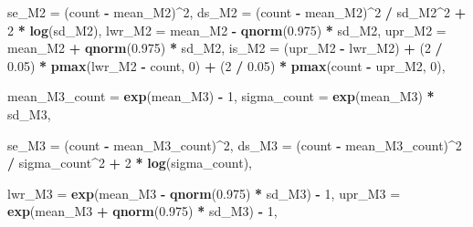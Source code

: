 \documentclass[
]{article}
\newenvironment{Shaded}{\begin{snugshade}}{\end{snugshade}}
\newcommand{\AttributeTok}[1]{\textcolor[rgb]{0.13,0.29,0.53}{#1}}
\newcommand{\DecValTok}[1]{\textcolor[rgb]{0.00,0.00,0.81}{#1}}
\newcommand{\FloatTok}[1]{\textcolor[rgb]{0.00,0.00,0.81}{#1}}
\newcommand{\FunctionTok}[1]{\textcolor[rgb]{0.13,0.29,0.53}{\textbf{#1}}}
\newcommand{\NormalTok}[1]{#1}
\newcommand{\SpecialCharTok}[1]{\textcolor[rgb]{0.81,0.36,0.00}{\textbf{#1}}}
\begin{document}
\begin{Shaded}
\begin{Highlighting}[]
    \AttributeTok{se\_M2 =}\NormalTok{ (count }\SpecialCharTok{{-}}\NormalTok{ mean\_M2)}\SpecialCharTok{\^{}}\DecValTok{2}\NormalTok{,}
    \AttributeTok{ds\_M2 =}\NormalTok{ (count }\SpecialCharTok{{-}}\NormalTok{ mean\_M2)}\SpecialCharTok{\^{}}\DecValTok{2} \SpecialCharTok{/}\NormalTok{ sd\_M2}\SpecialCharTok{\^{}}\DecValTok{2} \SpecialCharTok{+} \DecValTok{2} \SpecialCharTok{*} \FunctionTok{log}\NormalTok{(sd\_M2),}
    \AttributeTok{lwr\_M2 =}\NormalTok{ mean\_M2 }\SpecialCharTok{{-}} \FunctionTok{qnorm}\NormalTok{(}\FloatTok{0.975}\NormalTok{) }\SpecialCharTok{*}\NormalTok{ sd\_M2,}
    \AttributeTok{upr\_M2 =}\NormalTok{ mean\_M2 }\SpecialCharTok{+} \FunctionTok{qnorm}\NormalTok{(}\FloatTok{0.975}\NormalTok{) }\SpecialCharTok{*}\NormalTok{ sd\_M2,}
    \AttributeTok{is\_M2 =}\NormalTok{ (upr\_M2 }\SpecialCharTok{{-}}\NormalTok{ lwr\_M2) }\SpecialCharTok{+}
\NormalTok{      (}\DecValTok{2} \SpecialCharTok{/} \FloatTok{0.05}\NormalTok{) }\SpecialCharTok{*} \FunctionTok{pmax}\NormalTok{(lwr\_M2 }\SpecialCharTok{{-}}\NormalTok{ count, }\DecValTok{0}\NormalTok{) }\SpecialCharTok{+}
\NormalTok{      (}\DecValTok{2} \SpecialCharTok{/} \FloatTok{0.05}\NormalTok{) }\SpecialCharTok{*} \FunctionTok{pmax}\NormalTok{(count }\SpecialCharTok{{-}}\NormalTok{ upr\_M2, }\DecValTok{0}\NormalTok{),}
    
    \AttributeTok{mean\_M3\_count    =} \FunctionTok{exp}\NormalTok{(mean\_M3) }\SpecialCharTok{{-}} \DecValTok{1}\NormalTok{,}
    \AttributeTok{sigma\_count =} \FunctionTok{exp}\NormalTok{(mean\_M3) }\SpecialCharTok{*}\NormalTok{ sd\_M3,}
    
    \AttributeTok{se\_M3  =}\NormalTok{ (count }\SpecialCharTok{{-}}\NormalTok{ mean\_M3\_count)}\SpecialCharTok{\^{}}\DecValTok{2}\NormalTok{,}
    \AttributeTok{ds\_M3  =}\NormalTok{ (count }\SpecialCharTok{{-}}\NormalTok{ mean\_M3\_count)}\SpecialCharTok{\^{}}\DecValTok{2} \SpecialCharTok{/}\NormalTok{ sigma\_count}\SpecialCharTok{\^{}}\DecValTok{2} \SpecialCharTok{+} \DecValTok{2} \SpecialCharTok{*} \FunctionTok{log}\NormalTok{(sigma\_count),}
    
    \AttributeTok{lwr\_M3 =} \FunctionTok{exp}\NormalTok{(mean\_M3 }\SpecialCharTok{{-}} \FunctionTok{qnorm}\NormalTok{(}\FloatTok{0.975}\NormalTok{) }\SpecialCharTok{*}\NormalTok{ sd\_M3) }\SpecialCharTok{{-}} \DecValTok{1}\NormalTok{,}
    \AttributeTok{upr\_M3 =} \FunctionTok{exp}\NormalTok{(mean\_M3 }\SpecialCharTok{+} \FunctionTok{qnorm}\NormalTok{(}\FloatTok{0.975}\NormalTok{) }\SpecialCharTok{*}\NormalTok{ sd\_M3) }\SpecialCharTok{{-}} \DecValTok{1}\NormalTok{,}
    

\end{Highlighting}
\end{Shaded}
\end{document}
